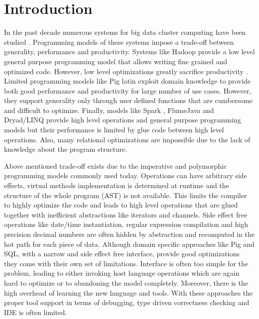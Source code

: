 \section{Introduction}
\label{sec:introduction}

In the past decade numerous systems for big data cluster computing have been studied \cite{dean_mapreduce:_2008, yu_dryadlinq:_2008-1, olston_pig_2008-1, thusoo_hive_2010-1, zaharia_spark:_2010}. Programming models of these systems impose a trade-off between generality, performance and productivity. Systems like Hadoop \cite{_hadoop_????} provide a low level general purpose programming model that allows writing fine grained and optimized code.  However, low level optimizations greatly sacrifice productivity \cite{chambers_flumejava:_2010}. Limited programming models like Pig latin \cite{olston_pig_2008-1} exploit domain knowledge to provide both good performance and productivity for large number of use cases. However, they support generality only through user defined functions that are cumbersome and difficult to optimize. Finally, models like Spark \cite{zaharia_spark:_2010}, FlumeJava \cite{chambers_flumejava:_2010} and Dryad/LINQ \cite{yu_dryadlinq:_2008-1} provide high level operations and general purpose programming models but their performance is limited by glue code between high level operations. Also, many relational optimizations are impossible due to the lack of knowledge about the program structure. 

Above mentioned trade-off exists due to the imperative and polymorphic programming models commonly used today. Operations can have arbitrary side effects, virtual methods implementation is determined at runtime and the structure of the whole program (AST) is not available. This limits the compiler to highly optimize the code and leads to high level operations that are glued together with inefficient abstractions like iterators and channels. Side effect free operations like date/time instantiation, regular expression compilation and high precision decimal numbers are often hidden by abstraction and recomputed in the hot path for each piece of data. Although domain specific approaches like Pig and SQL, with a narrow and side effect free interface, provide good optimizations they come with their own set of limitations. Interface is often too simple for the problem, leading to either invoking host language operations which are again hard to optimize or to abandoning the model completely. Moreover, there is the high overhead of learning the new language and tools. With these approaches the proper tool support in terms of debugging, type driven correctness checking and IDE is often limited.     


